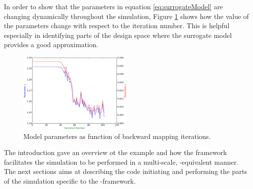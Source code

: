 %
In order to show that the parameters in equation \ref{eq:surrogateModel} are changing dynamically throughout the simulation, Figure \ref{fig:twoTanks:Params} shows how the value of the parameters change with respect to the iteration number. 
This is helpful especially in identifying parts of the design space where the surrogate model provides a good approximation.
%
\begin{figure}
  \centering
  \includegraphics[width=0.5\textwidth,keepaspectratio=true]{./Content/Figures/plotparams.eps}
  \caption{Model parameters as function of backward mapping iterations.}
  \label{fig:twoTanks:Params}
\end{figure}
%
The introduction gave an overview ot the example and how the framework facilitates the simulation to be performed in a multi-scale, {\MoDeNa}-equivalent manner. 
The next sections aims at describing the code initiating and performing the parts of the simulation specific to the {\MoDeNa}-framework.
